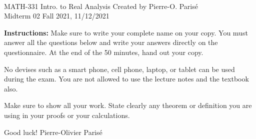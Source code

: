 \documentclass[addpoints, 12pt]{exam}%
\theoremstyle{definition}
\begin{document}
	\noindent \hrulefill \\
	MATH-331 Intro. to Real Analysis \hfill Created by Pierre-O. Paris{\'e}\\
	Midterm 02 \hfill Fall 2021, 11/12/2021\\\vspace*{-0.7cm}
	
	\noindent\hrulefill
	
\vspace*{1cm}

\noindent{}

\vspace*{1cm}
\begin{center}
\gradetable[h][questions]
\end{center}
\vspace*{1cm}

{\bf Instructions:} Make sure to write your complete name on your copy. You must answer all the questions below and write your answers directly on the questionnaire. At the end of the 50 minutes, hand out your copy. 

No devises such as a smart phone, cell phone, laptop, or tablet can be used during the exam. You are not allowed to use the lecture notes and the textbook also.

Make sure to show all your work. State clearly any theorem or definition you are using in your proofs or your calculations.

\vspace*{2cm}
\noindent Good luck! \hfill Pierre-Olivier Parisé


\vspace*{0.5cm}

\newpage
\end{document}

